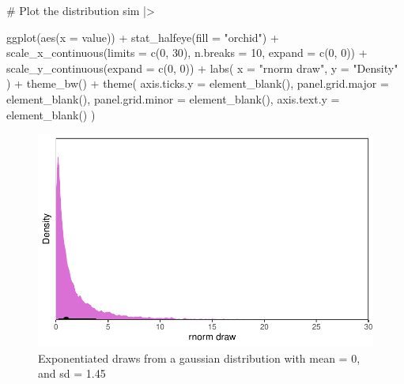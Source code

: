 \documentclass[
  letterpaper,
  DIV=11,
  numbers=noendperiod]{scrreprt}
\newenvironment{Shaded}{\begin{snugshade}}{\end{snugshade}}
\newcommand{\AttributeTok}[1]{\textcolor[rgb]{0.40,0.45,0.13}{#1}}
\newcommand{\CommentTok}[1]{\textcolor[rgb]{0.37,0.37,0.37}{#1}}
\newcommand{\DecValTok}[1]{\textcolor[rgb]{0.68,0.00,0.00}{#1}}
\newcommand{\FunctionTok}[1]{\textcolor[rgb]{0.28,0.35,0.67}{#1}}
\newcommand{\NormalTok}[1]{\textcolor[rgb]{0.00,0.23,0.31}{#1}}
\newcommand{\SpecialCharTok}[1]{\textcolor[rgb]{0.37,0.37,0.37}{#1}}
\newcommand{\StringTok}[1]{\textcolor[rgb]{0.13,0.47,0.30}{#1}}
\begin{document}
\begin{Shaded}
\begin{Highlighting}[]
\CommentTok{\# Plot the distribution}
\NormalTok{sim }\SpecialCharTok{|\textgreater{}}

    \FunctionTok{ggplot}\NormalTok{(}\FunctionTok{aes}\NormalTok{(}\AttributeTok{x =}\NormalTok{ value)) }\SpecialCharTok{+}
    \FunctionTok{stat\_halfeye}\NormalTok{(}\AttributeTok{fill =} \StringTok{"orchid"}\NormalTok{) }\SpecialCharTok{+}
    \FunctionTok{scale\_x\_continuous}\NormalTok{(}\AttributeTok{limits =} \FunctionTok{c}\NormalTok{(}\DecValTok{0}\NormalTok{, }\DecValTok{30}\NormalTok{), }\AttributeTok{n.breaks =} \DecValTok{10}\NormalTok{, }\AttributeTok{expand =} \FunctionTok{c}\NormalTok{(}\DecValTok{0}\NormalTok{, }\DecValTok{0}\NormalTok{)) }\SpecialCharTok{+}
    \FunctionTok{scale\_y\_continuous}\NormalTok{(}\AttributeTok{expand =} \FunctionTok{c}\NormalTok{(}\DecValTok{0}\NormalTok{, }\DecValTok{0}\NormalTok{)) }\SpecialCharTok{+}
    \FunctionTok{labs}\NormalTok{(}
      \AttributeTok{x =} \StringTok{"rnorm draw"}\NormalTok{,}
      \AttributeTok{y =} \StringTok{"Density"}
\NormalTok{    ) }\SpecialCharTok{+}
    \FunctionTok{theme\_bw}\NormalTok{() }\SpecialCharTok{+}
    \FunctionTok{theme}\NormalTok{(}
      \AttributeTok{axis.ticks.y =} \FunctionTok{element\_blank}\NormalTok{(),}
      \AttributeTok{panel.grid.major =} \FunctionTok{element\_blank}\NormalTok{(),}
      \AttributeTok{panel.grid.minor =} \FunctionTok{element\_blank}\NormalTok{(),}
      \AttributeTok{axis.text.y =} \FunctionTok{element\_blank}\NormalTok{()}
\NormalTok{    )}
\end{Highlighting}
\end{Shaded}

\begin{figure}[H]

{\centering \includegraphics{./bayesian-cfa_files/figure-pdf/prior-pred-weibull-coefs-1.pdf}

}

\caption{Exponentiated draws from a gaussian distribution with mean = 0,
and sd = 1.45}

\end{figure}
\end{document}
